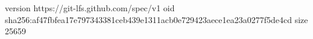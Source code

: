 version https://git-lfs.github.com/spec/v1
oid sha256:af47fbfea17e797343381ceb439e1311acb0e729423aece1ea23a0277f5de4cd
size 25659
